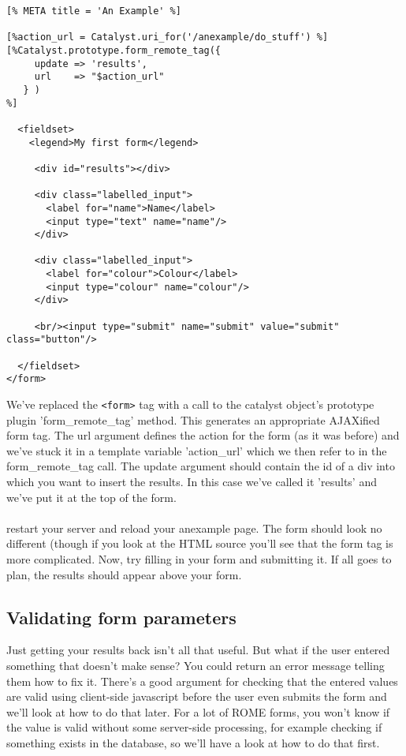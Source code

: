 \begin{verbatim}
[% META title = 'An Example' %]

[%action_url = Catalyst.uri_for('/anexample/do_stuff') %]
[%Catalyst.prototype.form_remote_tag({
     update => 'results',
     url    => "$action_url"
   } )
%]

  <fieldset>
    <legend>My first form</legend>

     <div id="results"></div>
    
     <div class="labelled_input">
       <label for="name">Name</label>
       <input type="text" name="name"/>
     </div>  

     <div class="labelled_input">
       <label for="colour">Colour</label>
       <input type="colour" name="colour"/>
     </div>

     <br/><input type="submit" name="submit" value="submit" class="button"/> 

  </fieldset>
</form>
\end{verbatim}

We've replaced the \verb|<form>| tag with a call to the catalyst object's prototype plugin 'form\_remote\_tag' method. This generates an appropriate AJAX\-ified form tag. The url argument defines the action for the form (as it was before) and we've stuck it in a template variable 'action\_url' which we then refer to in the form\_remote\_tag call. The update argument should contain the id of a div into which you want to insert the results. In this case we've called it 'results' and we've put it at the top of the form.

\paragraph*{}
restart your server and reload your anexample page. The form should look no different (though if you look at the HTML source you'll see that the form tag is more complicated. Now, try filling in your form and submitting it. If all goes to plan, the results should appear above your form.

\subsection{Validating form parameters}
Just getting your results back isn't all that useful. But what if the user entered something that doesn't make sense? You could return an error message telling them how to fix it. There's a good argument for checking that the entered values are valid using client-side javascript before the user even submits the form and we'll look at how to do that later. For a lot of ROME forms, you won't know if the value is valid without some server-side processing, for example checking if something exists in the database, so we'll have a look at how to do that first.


